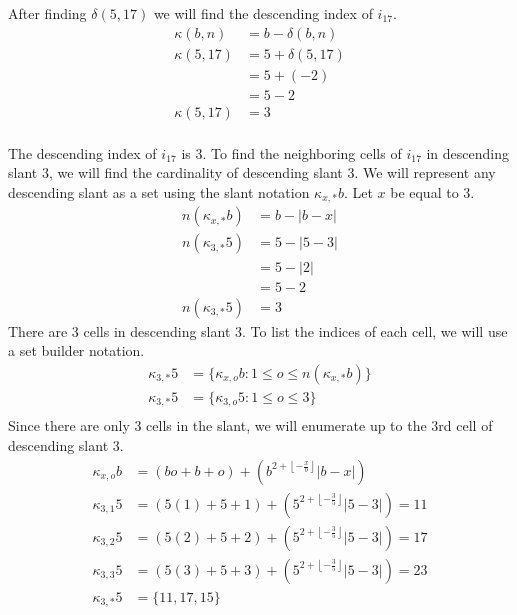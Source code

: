 \documentclass[letterpaper, twoside,12pt]{article}
\begin{document}
    After finding $\delta(5,17)$ we will find the descending index of $i_{17}$.
    \begin{equation*}
        \begin{split}
            \kappa(b,n) &= b - \delta(b,n)\\
            \kappa(5,17) &= 5 + \delta(5,17)\\
                &= 5 + (-2)\\
                &= 5 - 2\\
            \kappa(5,17) &= 3\\
        \end{split}
    \end{equation*}

    The descending index of $i_{17}$ is 3. To find the neighboring cells of $i_{17}$ in descending slant 3, we will find the cardinality of descending slant 3. We will represent any descending slant as a set using the slant notation $\kappa_{x,*}b$. Let $x$ be equal to 3.
    \begin{equation*}
        \begin{split}
            n(\kappa_{x,*}b) &= b - |b - x| \\
            n(\kappa_{3,*}5) &= 5 - |5 - 3| \\
                &= 5 - |2| \\
                &= 5 - 2 \\
            n(\kappa_{3,*}5) &= 3 
        \end{split}
    \end{equation*}
    There are 3 cells in descending slant 3. To list the indices of each cell, we will use a set builder notation.
    \begin{equation*}
        \begin{split}
            \kappa_{3,*}5 &= \{ \kappa_{x,o}b : 1 \leq o \leq n(\kappa_{x,*}b) \} \\
            \kappa_{3,*}5 &= \{ \kappa_{3,o}5 : 1 \leq o \leq 3 \} \\
        \end{split}
    \end{equation*}
    Since there are only 3 cells in the slant, we will enumerate up to the 3rd cell of descending slant 3.
    \begin{equation*}
        \begin{split}
            \kappa_{x,o}b &= (bo + b + o) + (b^{2 + \left\lfloor -\frac{x}{b} \right\rfloor }|b-x|) \\
            \kappa_{3,1}5 &= (5(1) + 5 + 1) + (5^{2 + \left\lfloor -\frac{3}{5} \right\rfloor }|5-3|) = 11\\
            \kappa_{3,2}5 &= (5(2) + 5 + 2) + (5^{2 + \left\lfloor -\frac{3}{5} \right\rfloor }|5-3|) = 17\\
            \kappa_{3,3}5 &= (5(3) + 5 + 3) + (5^{2 + \left\lfloor -\frac{3}{5} \right\rfloor }|5-3|) = 23\\
            \kappa_{3,*}5 &= \{11, 17, 15\}
        \end{split}
    \end{equation*}
\end{document}
